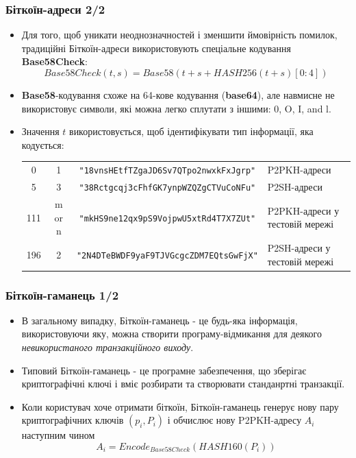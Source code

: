 \documentclass{beamer}
\begin{document}
\begin{frame}[fragile]
  \frametitle{Біткоїн-адреси 2/2}
  \begin{itemize}
  \item Для того, щоб уникати неоднозначностей і зменшити ймовірність помилок,
    традиційні Біткоїн-адреси використовують спеціальне кодування
    \textbf{Base58Check}:
    $$Base58Check(t, s) = Base58(t + s + HASH256(t + s)[0:4])$$
  \item \textbf{Base58}-кодування схоже на 64-кове кодування (\textbf{base64}),
    але навмисне не використовує символи, які можна легко сплутати з іншими: 0,
    O, I, and l.
  \item Значення $t$ використовується, щоб ідентифікувати тип інформації, яка
    кодується:
    \break
    \break
    \tiny
    \begin{tabular}{cccl}
      0 & 1 & \texttt{"18vnsHEtfTZgaJD6Sv7QTpo2nwxkFxJgrp"} & P2PKH-адреси \\
      5 & 3 & \texttt{"38Rctgcqj3cFhfGK7ynpWZQZgCTVuCoNFu"} & P2SH-адреси \\
      111 & m or n & \texttt{"mkHS9ne12qx9pS9VojpwU5xtRd4T7X7ZUt"} & P2PKH-адреси у тестовій мережі \\
      196 & 2 & \texttt{"2N4DTeBWDF9yaF9TJVGcgcZDM7EQtsGwFjX"} & P2SH-адреси у тестовій мережі \\
    \end{tabular}
  \end{itemize}
\end{frame}

\begin{frame}[fragile]
  \frametitle{Біткоїн-гаманець 1/2}
  \begin{itemize}
  \item В загальному випадку, Біткоїн-гаманець - це будь-яка інформація,
    використовуючи яку, можна створити програму-відмикання для деякого
    \textit{невикористаного транзакційного виходу}.
  \item Типовий Біткоїн-гаманець - це програмне забезпечення, що зберігає
    криптографічні ключі і вміє розбирати та створювати станданртні транзакції.
  \item Коли користувач хоче отримати біткоїн, Біткоїн-гаманець генерує нову
    пару криптографічних ключів $(p_i, P_i)$ і обчислює нову P2PKH-адресу $A_i$
    наступним чином
    $$A_i = Encode_{Base58Check}(HASH160(P_i))$$
  \end{itemize}
\end{frame}
\end{document}

